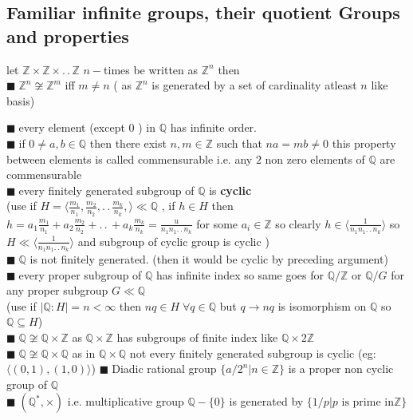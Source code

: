 \documentclass[11pt]{extarticle}
\newcommand{\Z}{\mathbb{Z}}
\newcommand{\Q}{\mathbb{Q}}
\newcommand{\ra}{\rightarrow}
\newcommand{\w}[1]{\text{#1}}
\newcommand{\ck}{.\,.\,}
\newcommand{\snote}[1]{{\footnotesize(#1)}}
\newcommand{\y}{$\blacksquare\;$}
\newcommand{\gen}[1]{\langle #1 \rangle}
\newcommand{\tbx}[2][]{
	\begin{tcolorbox}[enhanced,breakable,size=small,colback=black!2!white,title={#1},arc is angular, arc=1.5mm,drop fuzzy shadow]
		#2
	\end{tcolorbox}
}
\newcommand{\tm}{\times}
\begin{document}
\begin{multicols}{2}
\subsection{\small Familiar infinite groups, their quotient Groups and properties }
\tbx[$\Z$]{ let $ \Z\tm \Z\tm \ck \Z $ $ n-$times be written as $ \Z^n $ then\\
\y $ \Z^n\not\cong \Z^m $ iff $ m\neq n $ \snote{ as $ \Z^n $ is generated by a set of cardinality atleast $ n $ like basis}
 }
\tbx[$ \Q $  ]{
\y every element \snote{except $ 0 $ } in $ \Q $ has infinite order.\\
\y if $ 0\neq a,b \in \Q $  then there exist $ n,m\in \Z $ such that $ na=mb \neq 0$ this property between elements is called commensurable i.e. any $ 2 $ non zero elements of $ \Q $ are commensurable\\
\y every finitely generated subgroup of $ \Q$ is \textbf{cyclic}\\
\snote{use if $ H=\gen{\frac{ m_1 }{n_1},\frac{ m_2}{n_2},\ck \frac{ m_k }{n_k},} \ll \Q   $ , if $ h\in H  $ then 
	$ h= a_1\frac{ m_1 }{n_1}+a_2\frac{ m_2}{n_2}+\ck+a_k \frac{ m_k }{n_k}= \frac{ u }{n_1n_1\ck n_k} $ for some $ a_i\in \Z $  so clearly $ h\in \gen{\frac{ 1 }{n_1n_1\ck n_k} } $ so $ H\ll  \gen{\frac{ 1 }{n_1n_1\ck n_k}}$ and subgroup of cyclic group is cyclic }\\
\y $ \Q $ is not finitely generated. \snote{then it would be cyclic by preceding argument}\\
\y every proper subgroup of $ \Q $ has infinite index so same goes for $ \Q/\Z $ or $ \Q/G $ for any proper subgroup $ G\ll \Q $   \\
\snote{use if $ |\Q:H|=n<\infty $  then $ nq\in H \; \forall q \in \Q$ but $ q\ra nq $ is isomorphism on $ \Q $ so $ \Q\subseteq H $}\\
\y $ \Q\not\cong \Q\times \Z $ as $ \Q\times \Z  $ has subgroups of finite index like $ \Q\times 2\Z  $ \\
\y $ \Q\not\cong \Q\times \Q$ as in $ \Q\times \Q  $ not every finitely generated subgroup is cyclic \snote{eg: $\gen{(0,1),(1,0)}$}
\y Diadic rational group $ \{a/2^n|n\in \Z\} $ is a proper non cyclic group of $ \Q $ \\
\y $ (\Q^*,\tm) $ i.e. multiplicative group $\Q-\{0\} $ is generated by $ \{1/p|p \w{ is prime in} \Z\} $ }


\end{multicols}
\end{document}
